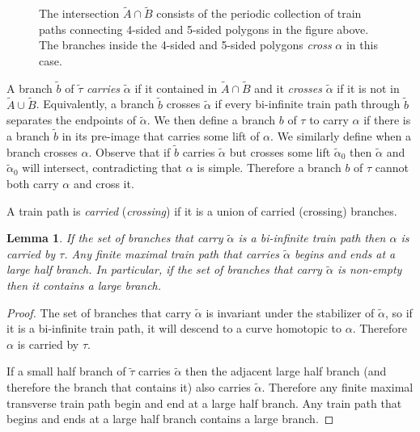 \documentclass[11pt]{article}
\newtheorem{lemma}[thm]{Lemma}
\theoremstyle{remark}
\begin{document}
\begin{figure}[h]

  \centering

  \def\svgwidth{0.6\textwidth}
  

  \caption{The intersection $\tilde{A} \cap \tilde{B}$ consists of the periodic collection
  of train paths connecting 4-sided and 5-sided polygons in the figure above.
  The branches inside the 4-sided and 5-sided polygons \emph{cross} $\alpha$
  in this case.}
  \label{fig:polygonal_region}
\end{figure}

A branch $\tilde b$ of $\tilde\tau$ {\em carries} $\tilde\alpha$ if it contained in $\tilde{A} \cap \tilde{B}$ and it {\em crosses} $\tilde\alpha$ if it is not in $\tilde{A}\cup \tilde{B}$. Equivalently, a branch $\tilde b$ crosses $\tilde\alpha$ if every bi-infinite train path through $\tilde b$ separates the endpoints of $\tilde \alpha$.
We then define a branch $b$ of $\tau$ to carry $\alpha$ if there is a branch $\tilde b$ in its pre-image that carries some lift of $\alpha$. We similarly define when a branch crosses $\alpha$.
Observe that if $\tilde b$ carries $\tilde\alpha$ but crosses some lift $\tilde\alpha_0$ then $\tilde\alpha$ and $\tilde\alpha_0$ will intersect, contradicting that $\alpha$ is simple.
Therefore a branch $b$ of $\tau$ cannot both carry $\alpha$ and cross it.

A train path is {\em carried} ({\em crossing}) if it is a union of carried (crossing) branches.

\begin{lemma}\label{traverse set}
If the set of branches that carry $\tilde\alpha$ is a bi-infinite train path then $\alpha$ is carried by $\tau$. Any finite maximal train path that carries $\tilde\alpha$ begins and ends at a large half branch. In particular, if the set of branches that carry $\tilde\alpha$ is non-empty then it contains a large branch.
\end{lemma}

\begin{proof}
The set of branches that carry $\tilde\alpha$ is invariant under the stabilizer of $\tilde\alpha$, so if it is a bi-infinite train path, it will descend to a curve homotopic to $\alpha$. Therefore $\alpha$ is carried by $\tau$.

If a small half branch of $\tilde\tau$ carries $\tilde\alpha$ then the adjacent large half branch (and therefore the branch that contains it) also carries $\tilde\alpha$. Therefore any finite maximal transverse train path begin and end at a large half branch. Any train path that begins and ends at a large half branch contains a large branch.
\end{proof}
\end{document}
